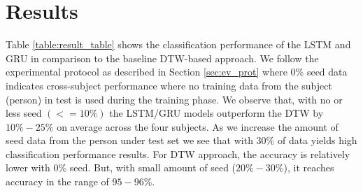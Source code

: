 \documentclass[10pt,twocolumn,letterpaper]{article}
\begin{document}
\section{Results}

Table \ref{table:result_table} shows the classification 
performance of the LSTM and GRU in comparison to the baseline DTW-based approach. We follow the experimental protocol as described in 
Section \ref{sec:ev_prot} where 0\% seed data indicates cross-subject performance where no training data from the subject (person) in test is used during the training phase. 
We observe that, with no or less seed $(<=10\%)$ the LSTM/GRU models outperform the DTW by $10\%-25\%$ on average across the four subjects. As we increase the amount of seed data from the person 
under test set we see that with $30\%$ of data yields high classification performance results. For DTW approach, the 
 accuracy is relatively lower with $0\%$ seed. But, with small amount of seed ($20\%-30\%$), it reaches accuracy in the range of $95-96\%$. 
 
 
 
\end{document}
